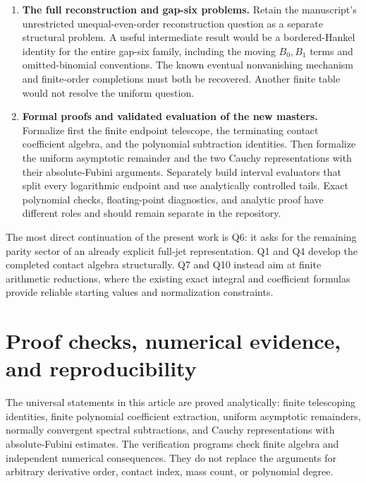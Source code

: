 \documentclass[11pt,letterpaper]{article}
\numberwithin{equation}{section}
\theoremstyle{definition}
\theoremstyle{remark}
\begin{document}
\begin{enumerate}[label=\textbf{Q\arabic*.}]
\item \textbf{The full reconstruction and gap-six problems.}
Retain the manuscript's unrestricted unequal-even-order reconstruction
question as a separate structural problem. A useful intermediate result
would be a bordered-Hankel identity for the entire gap-six family,
including the moving \(B_0,B_1\) terms and omitted-binomial conventions.
The known eventual nonvanishing mechanism and finite-order completions
must both be recovered. Another finite table would not resolve the
uniform question.

\item \textbf{Formal proofs and validated evaluation of the new masters.}
Formalize first the finite endpoint telescope, the terminating contact
coefficient algebra, and the polynomial subtraction identities.
Then formalize the uniform asymptotic remainder and the two Cauchy
representations with their absolute-Fubini arguments. Separately build
interval evaluators that split every logarithmic endpoint and use
analytically controlled tails. Exact polynomial checks, floating-point
diagnostics, and analytic proof have different roles and should remain
separate in the repository.
\end{enumerate}

The most direct continuation of the present work is Q6: it asks for the
remaining parity sector of an already explicit full-jet representation.
Q1 and Q4 develop the completed contact algebra structurally. Q7 and Q10
instead aim at finite arithmetic reductions, where the existing exact
integral and coefficient formulas provide reliable starting values and
normalization constraints.



\section{Proof checks, numerical evidence, and reproducibility}
\label{vf:section}

The universal statements in this article are proved analytically:
finite telescoping identities, finite polynomial coefficient extraction,
uniform asymptotic remainders, normally convergent spectral subtractions,
and Cauchy representations with absolute-Fubini estimates. The verification
programs check finite algebra and independent numerical consequences.
They do not replace the arguments for arbitrary derivative order, contact
index, mass count, or polynomial degree.
\end{document}
